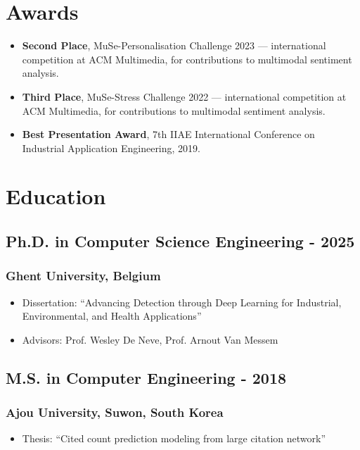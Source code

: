 \documentclass[11pt]{article}
\begin{document}
\section{Awards}
\begin{itemize}
    \item[\checkmark] \textbf{Second Place}, MuSe-Personalisation Challenge 2023 — international competition at ACM Multimedia, for contributions to multimodal sentiment analysis.
    \item[\checkmark] \textbf{Third Place}, MuSe-Stress Challenge 2022 — international competition at ACM Multimedia, for contributions to multimodal sentiment analysis.
    \item[\checkmark] \textbf{Best Presentation Award}, 7th IIAE International Conference on Industrial Application Engineering, 2019.
\end{itemize}

\section{Education}
\subsection{Ph.D. in Computer Science Engineering\hfill {} - 2025}
\subsubsection{Ghent University, Belgium}
\begin{itemize}
    \item[\checkmark] Dissertation: ``Advancing Detection through Deep Learning for Industrial, Environmental, and Health Applications''
    \item[\checkmark] Advisors: Prof. Wesley De Neve, Prof. Arnout Van Messem
\end{itemize}

\subsection{M.S. in Computer Engineering\hfill {} - 2018}
\subsubsection{Ajou University, Suwon, South Korea}
\begin{itemize}
    \item[\checkmark] Thesis: ``Cited count prediction modeling from large citation network''
\end{itemize}
\end{document}
